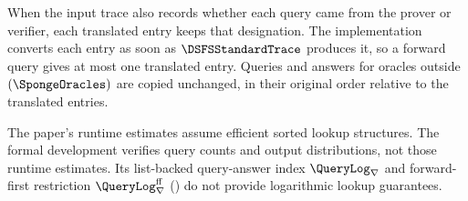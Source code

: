 \begin{definition}[D2STrace]
When the input trace also records whether each query came from the prover or verifier, each translated entry keeps that designation. The implementation converts each entry as soon as \(\DSFSStandardTrace\) produces it, so a forward query gives at most one translated entry. Queries and answers for oracles outside \((\SpongeOracles)\) are copied unchanged, in their original order relative to the translated entries.
\end{definition}

\begin{remark}
\label{rem:dsfs_procedures_time}
The paper's runtime estimates assume efficient sorted lookup structures. The formal development verifies query counts and output distributions, not those runtime estimates. Its list-backed query-answer index \(\QueryLog_{\nabla}\) and forward-first restriction \(\QueryLog_{\nabla}^{\mathrm{ff}}\) () do not provide logarithmic lookup guarantees.
\end{remark}
